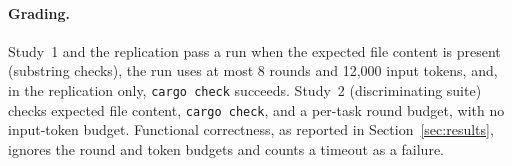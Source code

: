 \documentclass[smallcondensed,natbib]{svjour3}
\begin{document}
\paragraph{Grading.} Study~1 and the replication pass a run when the
expected file content is present (substring checks), the run uses at
most 8 rounds and 12{,}000 input tokens, and, in the replication only,
\texttt{cargo check} succeeds. Study~2 (discriminating suite) checks
expected file content, \texttt{cargo check}, and a per-task round
budget, with no input-token budget. Functional correctness, as
reported in Section~\ref{sec:results}, ignores the round and token
budgets and counts a timeout as a failure.
\end{document}
